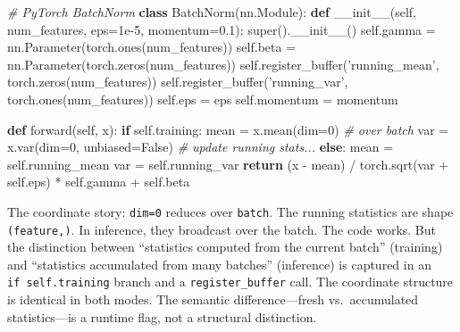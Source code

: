 \documentclass[11pt,titlepage]{article}
\newenvironment{Shaded}{}{}
\newcommand{\BuiltInTok}[1]{#1}
\newcommand{\CommentTok}[1]{\textcolor[rgb]{0.38,0.63,0.69}{\textit{#1}}}
\newcommand{\ControlFlowTok}[1]{\textcolor[rgb]{0.00,0.44,0.13}{\textbf{#1}}}
\newcommand{\DecValTok}[1]{\textcolor[rgb]{0.25,0.63,0.44}{#1}}
\newcommand{\FloatTok}[1]{\textcolor[rgb]{0.25,0.63,0.44}{#1}}
\newcommand{\FunctionTok}[1]{\textcolor[rgb]{0.02,0.16,0.49}{#1}}
\newcommand{\KeywordTok}[1]{\textcolor[rgb]{0.00,0.44,0.13}{\textbf{#1}}}
\newcommand{\NormalTok}[1]{#1}
\newcommand{\OperatorTok}[1]{\textcolor[rgb]{0.40,0.40,0.40}{#1}}
\newcommand{\StringTok}[1]{\textcolor[rgb]{0.25,0.44,0.63}{#1}}
\newcommand{\VariableTok}[1]{\textcolor[rgb]{0.10,0.09,0.49}{#1}}
\begin{document}
\begin{Shaded}
\begin{Highlighting}[]
\CommentTok{# PyTorch BatchNorm}
\KeywordTok{class}\NormalTok{ BatchNorm(nn.Module):}
    \KeywordTok{def} \FunctionTok{__init__}\NormalTok{(}\VariableTok{self}\NormalTok{, num_features, eps}\OperatorTok{=}\FloatTok{1e-5}\NormalTok{, momentum}\OperatorTok{=}\FloatTok{0.1}\NormalTok{):}
        \BuiltInTok{super}\NormalTok{().}\FunctionTok{__init__}\NormalTok{()}
        \VariableTok{self}\NormalTok{.gamma }\OperatorTok{=}\NormalTok{ nn.Parameter(torch.ones(num_features))}
        \VariableTok{self}\NormalTok{.beta }\OperatorTok{=}\NormalTok{ nn.Parameter(torch.zeros(num_features))}
        \VariableTok{self}\NormalTok{.register_buffer(}\StringTok{'running_mean'}\NormalTok{, torch.zeros(num_features))}
        \VariableTok{self}\NormalTok{.register_buffer(}\StringTok{'running_var'}\NormalTok{, torch.ones(num_features))}
        \VariableTok{self}\NormalTok{.eps }\OperatorTok{=}\NormalTok{ eps}
        \VariableTok{self}\NormalTok{.momentum }\OperatorTok{=}\NormalTok{ momentum}

    \KeywordTok{def}\NormalTok{ forward(}\VariableTok{self}\NormalTok{, x):}
        \ControlFlowTok{if} \VariableTok{self}\NormalTok{.training:}
\NormalTok{            mean }\OperatorTok{=}\NormalTok{ x.mean(dim}\OperatorTok{=}\DecValTok{0}\NormalTok{)  }\CommentTok{# over batch}
\NormalTok{            var }\OperatorTok{=}\NormalTok{ x.var(dim}\OperatorTok{=}\DecValTok{0}\NormalTok{, unbiased}\OperatorTok{=}\VariableTok{False}\NormalTok{)}
            \CommentTok{# update running stats...}
        \ControlFlowTok{else}\NormalTok{:}
\NormalTok{            mean }\OperatorTok{=} \VariableTok{self}\NormalTok{.running_mean}
\NormalTok{            var }\OperatorTok{=} \VariableTok{self}\NormalTok{.running_var}
        \ControlFlowTok{return}\NormalTok{ (x }\OperatorTok{-}\NormalTok{ mean) }\OperatorTok{/}\NormalTok{ torch.sqrt(var }\OperatorTok{+} \VariableTok{self}\NormalTok{.eps) }\OperatorTok{*} \VariableTok{self}\NormalTok{.gamma }\OperatorTok{+} \VariableTok{self}\NormalTok{.beta}
\end{Highlighting}
\end{Shaded}

The coordinate story: \texttt{dim=0} reduces over \texttt{batch}. The
running statistics are shape \texttt{(feature,)}. In inference, they
broadcast over the batch. The code works. But the distinction between
``statistics computed from the current batch'' (training) and
``statistics accumulated from many batches'' (inference) is captured in
an \texttt{if\ self.training} branch and a \texttt{register\_buffer}
call. The coordinate structure is identical in both modes. The semantic
difference---fresh vs.~accumulated statistics---is a runtime flag, not a
structural distinction.
\end{document}
